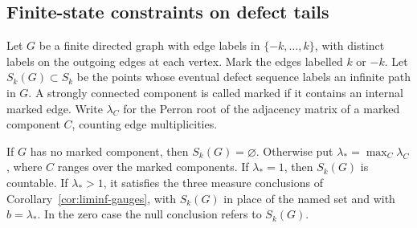 \subsection{Finite-state constraints on defect tails}\label{sec:finite-state-tail}

Let $G$ be a finite directed graph with edge labels in
$\{-k,\ldots,k\}$, with distinct labels on the outgoing edges at each
vertex. Mark the edges labelled $k$ or $-k$. Let $S_k(G)\subset S_k$ be
the points whose eventual defect sequence labels an infinite path in $G$.
A strongly connected component is called marked if it contains an internal
marked edge. Write $\lambda_C$ for the Perron root of the adjacency matrix
of a marked component $C$, counting edge multiplicities.

\begin{theorem}\label{thm:finite-state-tail}
If $G$ has no marked component, then $S_k(G)=\varnothing$.
Otherwise put $\lambda_*=\max_C\lambda_C$, where $C$ ranges over
the marked components. If $\lambda_*=1$, then $S_k(G)$ is countable.
If $\lambda_*>1$, it satisfies the three measure conclusions of
Corollary~\ref{cor:liminf-gauges}, with $S_k(G)$ in place of the named
set and with $b=\lambda_*$. In the zero case the null conclusion refers
to $S_k(G)$.
\end{theorem}

